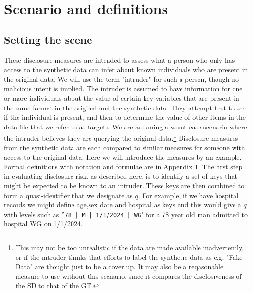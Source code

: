 \documentclass[12pt]{article}
\begin{document}
\section{Scenario and definitions}\label{sec:sc_def_not}
\subsection{Setting the scene}\label{subsec:scen}
These disclosure measures are intended to assess what a person who only has access 
to the synthetic data can infer about known individuals who are present in the original data. We will use the term "intruder" for such a person, though no malicious intent is implied. The intruder is assumed to have information for one or more individuals about the value of certain key variables that are present in the same format in the original and the synthetic data. They attempt first to see if the individual is present, and then to determine the value of other items in the data file that we refer to as targets. We are assuming a worst-case scenario where the intruder believes 
they are querying the original data.\footnote{This may not be too unrealistic if the data are made available inadvertently, or if the intruder thinks that efforts to label the synthetic data as e.g. "Fake Data" are thought just to be a cover up. It may also be a reqasonable measure to use without this scenario, since it compares the disclosiveness of the SD to that of the GT.}
Disclosure measures from the synthetic data are each compared to similar measures for someone with access to the original data. Here we will introduce the measures by an example. Formal definitions with notation and formulae are in Appendix 1.
The first step in evaluating disclosure risk, as described here, is to identify a set of keys that might be expected to be known to an intruder. These keys are then combined to form a quasi-identifier that we designate as $q$. For example, if we have hospital records we might define age,sex date and hospital as keys and this would give a $q$ with levels such as ''\texttt{78 | M | 1/1/2024 | WG}" for a 78 year old man admitted to hospital WG on 1/1/2024.
\end{document}
